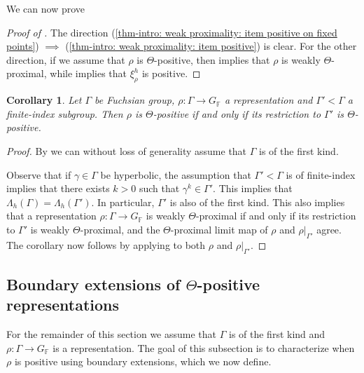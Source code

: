 \documentclass{amsart}
\theoremstyle{plain}
\newtheorem{corollary}[proposition]{Corollary}
\theoremstyle{definition}
\DeclareMathOperator{\Fb}{{\mathbb{F}}}
\newcommand*\from{\colon}
\newcommand{\1}{\mathbf{1}}
\begin{document}
We can now prove 

\begin{proof}[Proof of ]
    The direction (\ref{thm-intro: weak proximality: item positive on fixed points}) $\implies$ (\ref{thm-intro: weak proximality: item positive}) is clear. For the other direction, if we assume that $\rho$ is $\Theta$-positive, then  implies that $\rho$ is weakly $\Theta$-proximal, while  implies that $\xi^h_\rho$ is positive.
\end{proof}


\begin{corollary}
\label{cor: positivity finite-index subgroup}
    Let $\Gamma$ be Fuchsian group, $\rho \colon \Gamma \to G_{\Fb}$ a representation and $\Gamma' < \Gamma$ a finite-index subgroup.
    Then $\rho$ is $\Theta$-positive if and only if its restriction to $\Gamma'$ is $\Theta$-positive.
\end{corollary}

\begin{proof}
    By  we can without loss of generality assume that $\Gamma$ is of the first kind. 
    
    Observe that if $\gamma \in \Gamma$ be hyperbolic, the assumption that $\Gamma'<\Gamma$ is of finite-index implies that there exists $k>0$ such that $\gamma^k \in \Gamma'$. This implies that $\Lambda_h(\Gamma)=\Lambda_h(\Gamma')$. In particular, $\Gamma'$ is also of the first kind. This also implies that a representation $\rho:\Gamma\to G_{\Fb}$ is weakly $\Theta$-proximal if and only if its restriction to $\Gamma'$ is weakly $\Theta$-proximal, and the $\Theta$-proximal limit map of $\rho$ and $\rho|_{\Gamma'}$ agree. The corollary now follows by applying  to both $\rho$ and $\rho|_{\Gamma'}$.
\end{proof}

\subsection{%
\texorpdfstring{%
Boundary extensions of $\Theta$-positive representations}%
{Boundary extensions of Theta-positive representations}}
\label{subsec:boundary extension}
For the remainder of this section we assume that $\Gamma$ is of the first kind and $\rho \from \Gamma\to G_{\Fb}$ is a representation. The goal of this subsection is to characterize when $\rho$ is positive using boundary extensions, which we now define.
\end{document}
